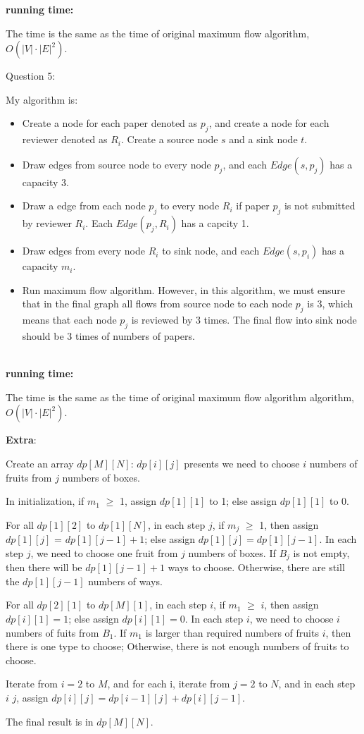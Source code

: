 \documentclass[12pt]{article}
\begin{document}
\textbf{running time:} \par
The time is the same as the time of original maximum flow algorithm, $O(|V|\cdot|E|^2)$.




\pagebreak
\noindent
\large Question 5: \par
\normalsize 
My algorithm is:
\begin{itemize}
  \item	Create a node for each paper denoted as $p_j$, and create a node for each reviewer denoted as $R_i$. Create a source node $s$ and a sink node $t$.
  \item Draw edges from source node to every node $p_j$, and each $Edge(s, p_j)$ has a capacity $3$. 
  \item Draw a edge from each node $p_j$ to every node $R_i$ if paper $p_j$ is not submitted by reviewer $R_i$.  
	Each $Edge(p_j, R_i)$ has a capcity 1. 
  \item Draw edges from every node $R_i$ to sink node, and each $Edge(s, p_i)$ has a capacity $m_i$.
  \item Run maximum flow algorithm. 
	However, in this algorithm, we must ensure that in the final graph all flows from source node to each node $p_j$ is 3, 
	which means that each node $p_j$ is reviewed by 3 times. 
	The final flow into sink node should be 3 times of numbers of papers.
\end{itemize}

\noindent \\
\textbf{running time:} \par
The time is the same as the time of original maximum flow algorithm algorithm, $O(|V|\cdot|E|^2)$.



\pagebreak
\large \textbf{Extra}:\\ \vspace{5mm}\par
\normalsize 
Create an array $dp[M][N]$: $dp[i][j]$ presents we need to choose $i$ numbers of fruits from $j$ numbers of boxes. \par
In initialization, if $m_1$ $\geq$ 1, assign $dp[1][1]$ to 1; else assign $dp[1][1]$ to 0. \par
For all $dp[1][2]$ to $dp[1][N]$, in each step $j$, if $m_j$ $\geq$ 1, then assign $dp[1][j]$ = $dp[1][j - 1] + 1$; else assign $dp[1][j] = dp[1][j - 1]$. 
In each step $j$, we need to choose one fruit from $j$ numbers of boxes. 
If $B_j$ is not empty, then there will be $dp[1][j - 1] + 1$ ways to choose.
Otherwise, there are still the $dp[1][j - 1]$ numbers of ways. \par
For all $dp[2][1]$ to $dp[M][1]$, in each step $i$, if $m_1$ $\geq$ $i$, then assign $dp[i][1] = 1$; else assign $dp[i][1] = 0$. 
In each step $i$, we need to choose $i$ numbers of fuits from $B_1$.
If $m_1$ is larger than required numbers of fruits $i$, then there is one type to choose; 
Otherwise, there is not enough numbers of fruits to choose. \par
Iterate from $i = 2$ to $M$, and for each i, iterate from $j = 2$ to $N$, 
and in each step $i$ $j$, assign $dp[i][j] = dp[i - 1][j] + dp[i][j - 1]$. \par
The final result is in $dp[M][N]$.
\end{document}

